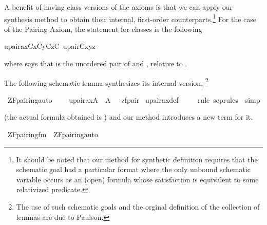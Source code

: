 A benefit of having class versions of the axioms is that we can
apply our synthesis method to obtain their internal, first-order
counterparts.\footnote{It should be noted that our method for
  synthetic definition requires that the schematic goal had a
  particular format where the only unbound schematic variable occurs
  as an (open) formula whose satisfaction is equivalent to some
  relativized predicate.}
For the case of the Pairing Axiom, the statement for classes is the
following
\begin{isabelle}
upair{\isacharunderscore}ax{\isacharparenleft}C{\isacharparenright}{\isacharequal}{\isacharequal}{\isasymforall}x{\isacharbrackleft}C{\isacharbrackright}{\isachardot}{\isasymforall}y{\isacharbrackleft}C{\isacharbrackright}{\isachardot}{\isasymexists}z{\isacharbrackleft}C{\isacharbrackright}{\isachardot}\ upair{\isacharparenleft}C{\isacharcomma}x{\isacharcomma}y{\isacharcomma}z{\isacharparenright}
\end{isabelle}
where  says that  is the unordered pair of
 and , relative to .

The following schematic lemma synthesizes its internal version,%
\footnote{The use of such schematic goals and the orginal definition
  of the collection of lemmas  are due to Paulson.}
\begin{isabelle}
\isamarkupfalse%
\ ZF{\isacharunderscore}pairing{\isacharunderscore}auto{\isacharcolon}\isanewline
\ \ \ \ {\isachardoublequoteopen}upair{\isacharunderscore}ax{\isacharparenleft}{\isacharhash}{\isacharhash}A{\isacharparenright}\ {\isasymlongleftrightarrow}\ {\isacharparenleft}A{\isacharcomma}\ {\isacharbrackleft}{\isacharbrackright}\ {\isasymTurnstile}\ {\isacharquery}zfpair{\isacharparenright}{\isachardoublequoteclose}\isanewline
{}\isamarkupfalse%
\ upair{\isacharunderscore}ax{\isacharunderscore}def\ \isanewline
\ \ \isamarkupfalse%
\ {\isacharparenleft}{\isacharparenleft}rule\ sep{\isacharunderscore}rules\ {\isacharbar}\ simp{\isacharparenright}{\isacharplus}{\isacharparenright}
\end{isabelle}
(the actual formula obtained is
) and
our  method introduces a new term
 for it.
\begin{isabelle}
\isamarkupfalse%
\ {\isachardoublequoteopen}ZF{\isacharunderscore}pairing{\isacharunderscore}fm{\isachardoublequoteclose}\ \ {\isachardoublequoteopen}ZF{\isacharunderscore}pairing{\isacharunderscore}auto{\isachardoublequoteclose}%
\end{isabelle}


